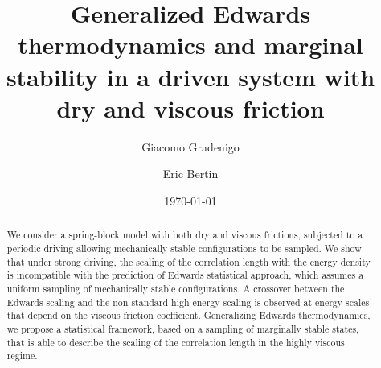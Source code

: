 \documentclass[prl,twocolumn,floats,floatfix,aps,superscriptaddress,showpacs]{revtex4-1}
\begin{document}
 
\title{Generalized Edwards thermodynamics and marginal stability in a driven system with dry and viscous friction}


\author{Giacomo Gradenigo}

\author{Eric Bertin}




\date{\today}

\begin{abstract}
We consider a spring-block model with both dry and viscous frictions,
subjected to a periodic driving allowing mechanically stable configurations to be sampled.  We show that under strong driving, the scaling of the
correlation length with the energy density is incompatible with the
prediction of Edwards statistical approach, which assumes a uniform
sampling of mechanically stable configurations. A crossover between
the Edwards scaling and the non-standard high energy scaling is
observed at energy scales that depend on the viscous friction
coefficient.
Generalizing Edwards thermodynamics, we propose a statistical
framework, based on a sampling of marginally stable states,
that is able to describe the scaling of the correlation length in
the highly viscous regime.
\end{abstract}

\maketitle 
\end{document}

